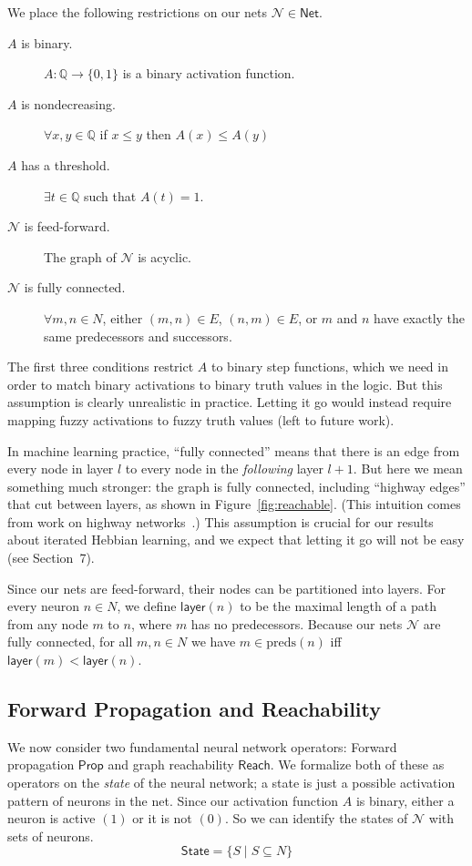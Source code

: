 \documentclass[letterpaper]{article}
\theoremstyle{definition}
\newcommand{\Rat}{\mathbb{Q}}
\newcommand{\State}{\mathsf{State}}
\newcommand{\set}[1]{\{ #1 \}}
\newcommand{\preds}[1]{\mbox{preds}(#1)}
\newcommand{\layer}[1]{\mathsf{layer}(#1)}
\newcommand{\AllNets}{\mathsf{Net}}
\newcommand{\Net}{\mathcal{N}}
\newcommand{\Prop}{\mathsf{Prop}}
\newcommand{\Reach}{\mathsf{Reach}}
\begin{document}
We place the following restrictions on our nets $\Net \in \AllNets$.
\begin{description}
    \item[$A$ is binary.] $A : \Rat \to \set{0, 1}$ is a binary activation function.
    \item[$A$ is nondecreasing.] $\forall x, y \in \Rat$ if $x \leq y$ then $A(x) \leq A(y)$
    \item[$A$ has a threshold.] $\exists t \in \Rat$ such that $A(t) = 1$.
    \item[$\Net$ is feed-forward.] The graph of $\Net$ is acyclic.
    \item[$\Net$ is fully connected.] $\forall m, n \in N$, either $(m, n) \in E$, $(n, m) \in E$, or $m$ and $n$ have exactly the same predecessors and successors.
\end{description}
The first three conditions restrict $A$ to binary step functions, which we need in order to match binary activations to binary truth values in the logic.  But this assumption is clearly unrealistic in practice.  Letting it go would instead require mapping fuzzy activations to fuzzy truth values (left to future work).

In machine learning practice, ``fully connected'' means that there is an edge from every node in layer $l$ to every node in the \emph{following} layer $l+1$.  But here we mean something much stronger: the graph is fully connected, including ``highway edges'' that cut between layers, as shown in Figure~\ref{fig:reachable}. (This intuition comes from work on highway networks~\cite{srivastava2015highway}.)  This assumption is crucial for our results about iterated Hebbian learning, and we expect that letting it go will not be easy (see Section~7).

Since our nets are feed-forward, their nodes can be partitioned into layers.  For every neuron $n \in N$, we define $\layer{n}$ to be the maximal length of a path from any node $m$ to $n$, where $m$ has no predecessors.  Because our nets $\Net$ are fully connected, for all $m, n \in N$ we have $m \in \preds{n}$ iff $\layer{m} < \layer{n}$.

\subsection{Forward Propagation and Reachability}

We now consider two fundamental neural network operators: Forward propagation $\Prop$ and graph reachability $\Reach$.  We formalize both of these as operators on the \emph{state} of the neural network; a state is just a possible activation pattern of neurons in the net.  Since our activation function $A$ is binary, either a neuron is active $(1)$ or it is not $(0)$. So we can identify the states of $\Net$ with sets of neurons.
\[
    \State = \set{S \mid S \subseteq N}
\]
\end{document}
